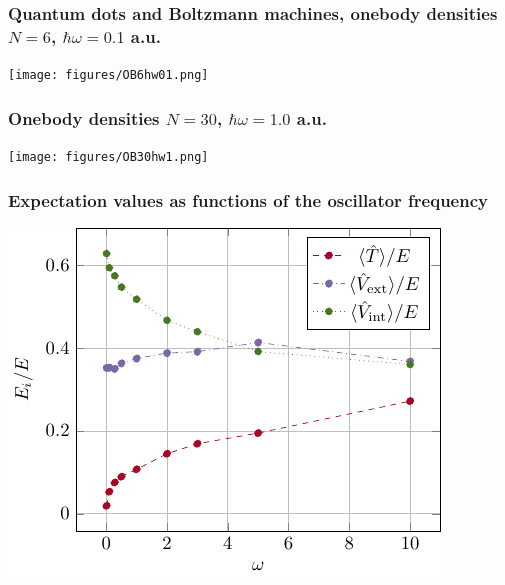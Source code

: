 \documentclass{beamer}
\begin{document}
\begin{frame}
\frametitle{Quantum dots and Boltzmann machines, onebody densities $N=6$, $\hbar\omega=0.1$ a.u.}

\begin{block}{}

\vspace{6mm}

\centerline{\texttt{[image: figures/OB6hw01.png]}}

\vspace{6mm}

\end{block}
\end{frame}

\begin{frame}
\frametitle{Onebody densities $N=30$, $\hbar\omega=1.0$ a.u.}

\begin{block}{}

\vspace{6mm}

\centerline{\texttt{[image: figures/OB30hw1.png]}}

\vspace{6mm}

\end{block}
\end{frame}

\begin{frame}
\frametitle{Expectation values as functions of the oscillator frequency}

\begin{block}{}

\vspace{6mm}

\centerline{\includegraphics[width=0.9\linewidth]{figures/virialtheorem.pdf}}

\vspace{6mm}

\end{block}
\end{frame}
\end{document}
